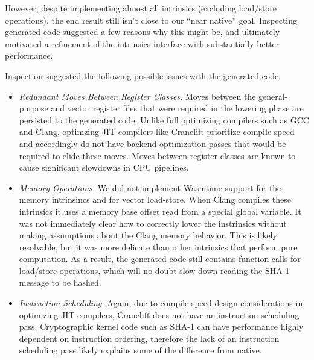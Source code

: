 \begin{center}

\end{center}

However, despite implementing almost all intrinsics (excluding load/store
operations), the end result still isn't close to our ``near native'' goal.
Inspecting generated code suggested a few reasons why this might be, and
ultimately motivated a refinement of the intrinsics interface with substantially
better performance.

Inspection suggested the following possible issues with the generated code:
%
\begin{itemize}
    \item \emph{Redundant Moves Between Register Classes.}
        Moves between the general-purpose and vector register files that were
        required in the lowering phase are persisted to the generated code.
        Unlike full optimizing compilers such as GCC and Clang, optimzing JIT
        compilers like Cranelift prioritize compile speed and accordingly do not
        have backend-optimization passes that would be required to elide these
        moves. Moves between register classes are known to cause significant
        slowdowns in CPU pipelines.
    \item \emph{Memory Operations.}
        We did not implement Wasmtime support for the memory intrinsincs
         and  for vector load-store. When
        Clang compiles these intrinsics it uses a memory base offset read from a
        special global variable. It was not immediately clear how to correctly
        lower the instrinsics without making assumptions about the Clang memory
        behavior. This is likely resolvable, but it was more delicate than other
        intrinsics that perform pure computation. As a result, the generated
        code still contains function calls for load/store operations, which will
        no doubt slow down reading the SHA-1 message to be hashed.
    \item \emph{Instruction Scheduling.}
        Again, due to compile speed design considerations in optimizing JIT
        compilers, Cranelift does not have an instruction scheduling pass.
        Cryptographic kernel code such as SHA-1 can have performance highly
        dependent on instruction ordering, therefore the lack of an instruction
        scheduling pass likely explains some of the difference from native.
\end{itemize}


